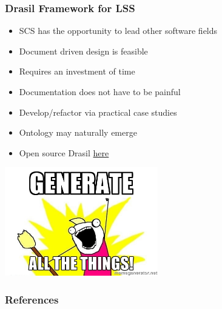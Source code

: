 \documentclass[t,12pt,numbers,fleqn]{beamer}
\begin{document}
\begin{frame}

\frametitle{Drasil Framework for LSS}

\begin{itemize}
\item SCS has the opportunity to lead other software fields%
\item Document driven design is feasible%
\item Requires an investment of time %
\item Documentation does not have to be painful
\item Develop/refactor via practical case studies
\item Ontology may naturally emerge
\item Open source Drasil \href{https://github.com/JacquesCarette/literate-scientific-software}{here}
\end{itemize}

\includegraphics[width=0.5\textwidth]{../Figures/generate_all_the_things.jpg}


\end{frame}


\begin{frame}[allowframebreaks]
\frametitle{References}



\end{frame}

\end{document}
